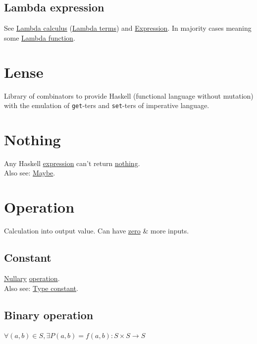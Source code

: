 \documentclass[a4paper,14pt,oneside]{book}
\begin{document}
\section{\label{org9c123e1}Lambda expression}
\label{sec:org02b2f67}
See \hyperref[org0f9cd10]{Lambda calculus} (\hyperref[orgf52d00b]{Lambda terms}) and \hyperref[org6aa6989]{Expression}. In majority cases meaning some \hyperref[org61a8244]{Lambda function}.\\

\chapter{\label{org83fcc60}Lense}
\label{sec:org211aedc}
Library of combinators to provide Haskell (functional language without mutation) with the emulation of \texttt{get}-ters and \texttt{set}-ters of imperative language.\\

\chapter{\label{org9ba77f5}Nothing}
\label{sec:orgad7b0ce}
Any Haskell \hyperref[org6aa6989]{expression} can't return \hyperref[org9ba77f5]{nothing}.\\

Also see: \hyperref[orga9bddfc]{Maybe}.\\

\chapter{\label{org6ed0c27}Operation}
\label{sec:orga4271d4}
Calculation into output value. Can have \hyperref[org5935190]{zero} \& more inputs.\\

\section{\label{orga5fcec4}Constant}
\label{sec:org44b6514}
\hyperref[org6c1bd06]{Nullary} \hyperref[org6ed0c27]{operation}.\\

Also see: \hyperref[orgf8a2ce7]{Type constant}.\\

\section{\label{orge2fb74d}Binary operation}
\label{sec:orgcdcf15f}
\(\forall (a,b) \in S, \exists P(a,b)=f(a,b): S \times S \to S\)\\
\end{document}
